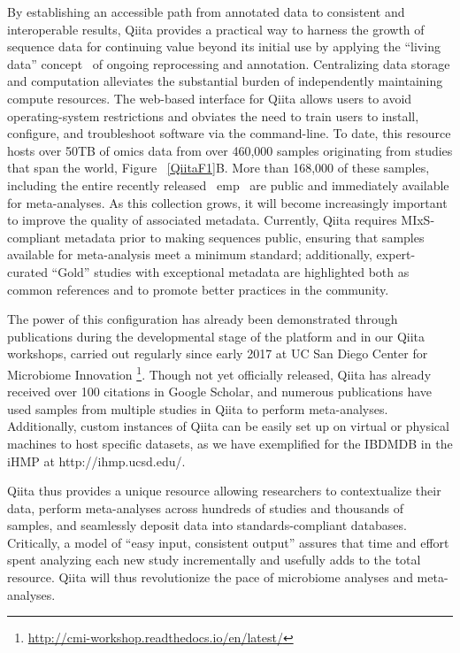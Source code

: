 By establishing an accessible path from annotated data to consistent and interoperable
results, Qiita provides a practical way to harness the growth of sequence data
for continuing value beyond its initial use by applying the “living data” concept~\cite{Wang2016}
of ongoing reprocessing and annotation. Centralizing data storage and computation
alleviates the substantial burden of independently maintaining compute resources.
The web-based interface for Qiita allows users to avoid operating-system restrictions
and obviates the need to train users to install, configure, and troubleshoot software
via the command-line. To date, this resource hosts over 50TB of omics data from over
460,000 samples originating from studies that span the world, Figure ~\ref{QiitaF1}B.
More than 168,000 of these samples, including the entire recently released ~\gls{emp}~\cite{Thompson2017}
are public and immediately available for meta-analyses. As this collection grows,
it will become increasingly important to improve the quality of associated metadata.
Currently, Qiita requires MIxS-compliant metadata prior to making sequences public,
ensuring that samples available for meta-analysis meet a minimum standard; additionally,
expert-curated “Gold” studies with exceptional metadata are highlighted both as common
references and to promote better practices in the community.

The power of this configuration has already been demonstrated through publications
during the developmental stage of the platform and in our Qiita workshops, carried
out regularly since early 2017 at UC San Diego Center for Microbiome Innovation
\footnote{\url{http://cmi-workshop.readthedocs.io/en/latest/}}. Though not yet
officially released, Qiita has already received over 100 citations in Google Scholar,
and numerous publications have used samples from multiple studies in Qiita to
perform meta-analyses. Additionally, custom instances of Qiita can be easily set
up on virtual or physical machines to host specific datasets, as we have exemplified
for the IBDMDB in the iHMP at http://ihmp.ucsd.edu/.

Qiita thus provides a unique resource allowing researchers to contextualize their data,
perform meta-analyses across hundreds of studies and thousands of samples, and
seamlessly deposit data into standards-compliant databases. Critically, a model
of “easy input, consistent output” assures that time and effort spent analyzing
each new study incrementally and usefully adds to the total resource. Qiita will
thus revolutionize the pace of microbiome analyses and meta-analyses.

